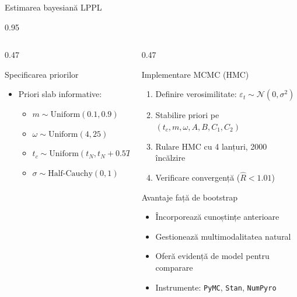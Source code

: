 \documentclass[9pt, aspectratio=169, t]{beamer}
\begin{document}
\begin{frame}{Estimarea bayesiană LPPL}
\begin{cminipage}{0.95\textwidth}
{\begin{columns}[T]
\begin{column}{0.47\textwidth}
            \begin{exampleblock}{Specificarea priorilor}
                \begin{itemize}\setlength{\itemsep}{0pt}
                    \item Priori slab informative:
                    \begin{itemize}\setlength{\itemsep}{0pt}
                        \item $m \sim \text{Uniform}(0.1, 0.9)$
                        \item $\omega \sim \text{Uniform}(4, 25)$
                        \item $t_c \sim \text{Uniform}(t_N, t_N + 0.5T)$
                        \item $\sigma \sim \text{Half-Cauchy}(0, 1)$
                    \end{itemize}
                \end{itemize}
            \end{exampleblock}
        \end{column}
        \begin{column}{0.47\textwidth}
            \begin{alertblock}{Implementare MCMC (HMC)}
                \begin{enumerate}\setlength{\itemsep}{0pt}
                    \item Definire verosimilitate: $\varepsilon_t \sim \mathcal{N}(0, \sigma^2)$
                    \item Stabilire priori pe $(t_c, m, \omega, A, B, C_1, C_2)$
                    \item Rulare HMC cu 4 lanțuri, 2000 încălzire
                    \item Verificare convergență ($\hat{R} < 1.01$)
                \end{enumerate}
            \end{alertblock}

            \begin{block}{Avantaje față de bootstrap}
                \begin{itemize}\setlength{\itemsep}{0pt}
                    \item Încorporează cunoștințe anterioare
                    \item Gestionează multimodalitatea natural
                    \item Oferă evidență de model pentru comparare
                    \item Instrumente: \texttt{PyMC}, \texttt{Stan}, \texttt{NumPyro}
                \end{itemize}
            \end{block}
        \end{column}
    \end{columns}
    }
    \end{cminipage}
\end{frame}
\end{document}
